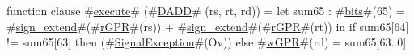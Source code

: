 function clause #\hyperref[zexecute]{execute}# (#\hyperref[zDADD]{DADD}# (rs, rt, rd)) =
  {
    let sum65 : #\hyperref[zbits]{bits}#(65) = #\hyperref[zsignzyextend]{sign\_extend}#(#\hyperref[zrGPR]{rGPR}#(rs)) + #\hyperref[zsignzyextend]{sign\_extend}#(#\hyperref[zrGPR]{rGPR}#(rt)) in
    {
      if sum65[64] != sum65[63] then
        (#\hyperref[zSignalException]{SignalException}#(Ov))
      else
        #\hyperref[zwGPR]{wGPR}#(rd) = sum65[63..0]
    }
  }
